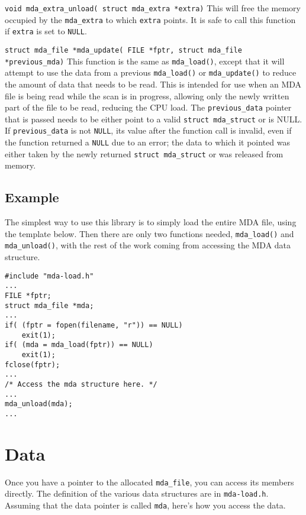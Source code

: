 \documentclass[10pt,letterpaper]{article}
\begin{document}
\vspace{1.5ex}
\noindent
\verb+void mda_extra_unload( struct mda_extra *extra)+ \linebreak
This will free the memory occupied by the \verb+mda_extra+ to which
\verb+extra+ points. It is safe to call this function if \verb+extra+
is set to \verb+NULL+.

\vspace{1.5ex}
\noindent
\verb+struct mda_file *mda_update( FILE *fptr, struct mda_file *previous_mda)+ \linebreak
This function is the same as \verb+mda_load()+, except that it will
attempt to use the data from a previous \verb+mda_load()+ or
\verb+mda_update()+ to reduce the amount of data that needs to be
read.  This is intended for use when an MDA file is being read while
the scan is in progress, allowing only the newly written part of the
file to be read, reducing the CPU load.  The \verb+previous_data+
pointer that is passed needs to be either point to a valid
\verb+struct mda_struct+ or is NULL.  If \verb+previous_data+ is not
\verb+NULL+, its value after the function call is invalid, even if the
function returned a \verb+NULL+ due to an error; the data to which it
pointed was either taken by the newly returned
\verb+struct mda_struct+ or was released from memory.

\subsection{Example}

The simplest way to use this library is to simply load the entire MDA
file, using the template below.  Then there are only two functions
needed, \verb+mda_load()+ and \verb+mda_unload()+, with the rest of
the work coming from accessing the MDA data structure.

\begin{verbatim}
#include "mda-load.h"
...
FILE *fptr;
struct mda_file *mda;
...
if( (fptr = fopen(filename, "r")) == NULL)
    exit(1);
if( (mda = mda_load(fptr)) == NULL)
    exit(1);
fclose(fptr);
...
/* Access the mda structure here. */
...
mda_unload(mda);
...
\end{verbatim}

\newpage

\section{Data}

Once you have a pointer to the allocated \verb+mda_file+, you can
access its members directly.  The definition of the various data
structures are in \verb+mda-load.h+.  Assuming that the data pointer
is called \verb+mda+, here's how you access the data.
\end{document}
